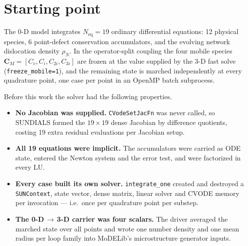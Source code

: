 \documentclass[11pt,a4paper]{article}
\newcommand{\code}[1]{\texttt{\small #1}}
\newcommand{\dpa}{\ensuremath{\mathrm{dpa}}}
\begin{document}
\begin{abstract}
A later revision corrects the coupled route itself. As first written it did not
perform an operator split: it read its mobile field out of a previously recorded
standalone run, so $\mathbf C_M$ never responded to the immobile state the march
was building. Section~\ref{sec:fastinloop} puts MoDELib3's own steady mobile
solve back inside the loop, through a new \code{useImmobileSolver} switch that
lets a DDomp run perform the fast step alone.
Section~\ref{sec:seedrelax} then measures what that repairs: a 0-D seed at
0.1 \dpa\ carries a $C_v$ some $690\times$ above the quasi-steady value and no
boundary layer at all, and the fast step supplies both corrections on its first
call.
\end{abstract}

\tableofcontents

\section{Starting point}

The 0-D model integrates $N_{\mathrm{eq}}=19$ ordinary differential equations:
12 physical species, 6 point-defect conservation accumulators, and the evolving
network dislocation density $\rho_N$. In the operator-split coupling the four
mobile species $\mathbf C_M=[C_v,C_i,C_{2i},C_{3i}]$ are frozen at the value
supplied by the 3-D fast solve (\code{freeze\_mobile=1}), and the remaining
state is marched independently at every quadrature point, one case per point in
an OpenMP batch subprocess.

Before this work the solver had the following properties.

\begin{itemize}
\item \textbf{No Jacobian was supplied.} \code{CVodeSetJacFn} was never called,
      so SUNDIALS formed the $19\times19$ dense Jacobian by difference
      quotients, costing 19 extra residual evaluations per Jacobian setup.
\item \textbf{All 19 equations were implicit.} The accumulators were carried as
      ODE state, entered the Newton system and the error test, and were
      factorized in every LU.
\item \textbf{Every case built its own solver.} \code{integrate\_one} created
      and destroyed a \code{SUNContext}, state vector, dense matrix, linear
      solver and CVODE memory per invocation --- i.e.\ once per quadrature
      point per substep.
\item \textbf{The 0-D\,$\to$\,3-D carrier was four scalars.} The driver
      averaged the marched state over all points and wrote one number density
      and one mean radius per loop family into MoDELib's microstructure
      generator inputs.
\end{itemize}
\end{document}
